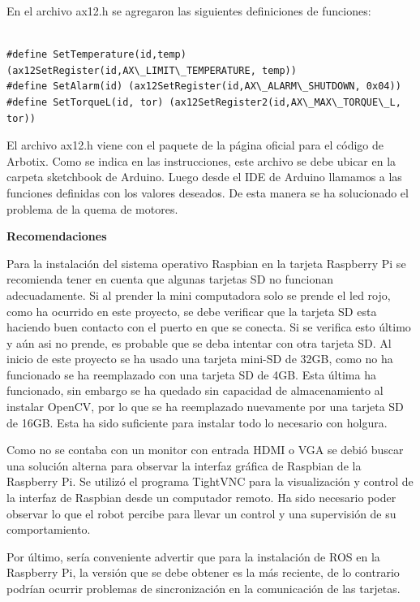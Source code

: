 \begin{itemize}
En el archivo ax12.h se agregaron las siguientes definiciones de funciones:

\begin{lstlisting}

#define SetTemperature(id,temp) (ax12SetRegister(id,AX\_LIMIT\_TEMPERATURE, temp))
#define SetAlarm(id) (ax12SetRegister(id,AX\_ALARM\_SHUTDOWN, 0x04)) 
#define SetTorqueL(id, tor) (ax12SetRegister2(id,AX\_MAX\_TORQUE\_L, tor)) 
\end{lstlisting}
 

El archivo ax12.h viene con el paquete de la p\'agina oficial para el código de Arbotix. Como se indica en las instrucciones, este archivo se debe ubicar en la carpeta sketchbook de Arduino. Luego desde el IDE de Arduino llamamos a las funciones definidas con los valores deseados. De esta manera se ha solucionado el problema de la quema de motores.

\end{itemize}

\textbf{Recomendaciones}  

Para la instalación del sistema operativo Raspbian en la tarjeta Raspberry Pi se recomienda tener en cuenta que algunas tarjetas SD no funcionan adecuadamente. Si al prender la mini computadora solo se prende el led rojo, como ha ocurrido en este proyecto, se debe verificar que la tarjeta SD esta haciendo buen contacto con el puerto en que se conecta. Si se verifica esto último y aún asi no prende, es probable que se deba intentar con otra tarjeta SD. Al inicio de este proyecto se ha usado una tarjeta mini-SD de 32GB, como no ha funcionado se ha reemplazado con una tarjeta SD de 4GB. Esta última ha funcionado, sin embargo se ha quedado sin capacidad de almacenamiento al instalar OpenCV, por lo que se ha reemplazado nuevamente por una tarjeta SD de 16GB. Esta ha sido suficiente para instalar todo lo necesario con holgura.    

Como no se contaba con un monitor con entrada HDMI o VGA se debió buscar una solución alterna para observar la interfaz gráfica de Raspbian de la Raspberry Pi. Se utilizó el programa TightVNC para la visualización y control de la interfaz de Raspbian desde un computador remoto. Ha sido necesario poder observar lo que el robot percibe para llevar un control y una supervisión de su comportamiento. 

Por último, sería conveniente advertir que para la instalación de ROS en la Raspberry Pi, la versión que se debe obtener es la más reciente, de lo contrario podrían ocurrir problemas de sincronización en la comunicación de las tarjetas.   



